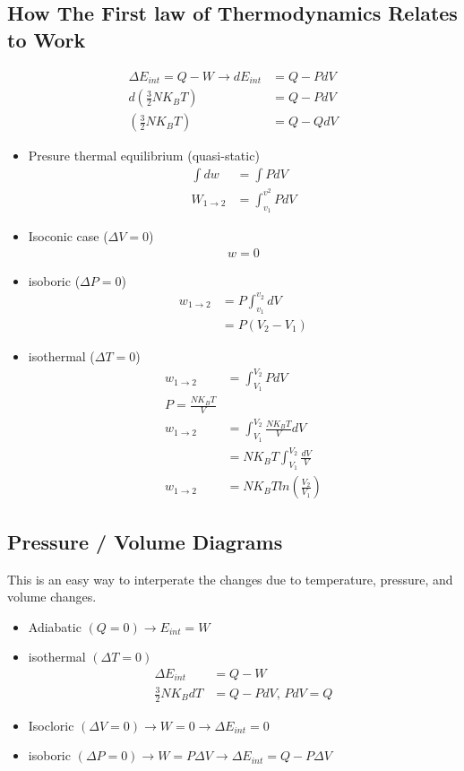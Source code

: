 	\subsection{How The First law of Thermodynamics Relates to Work}
	\begin{align*}
	\Delta E_{int} = Q-W \to dE_{int} &=Q-PdV\\
	d\left(\frac{3}{2}NK_BT\right) &= Q-PdV\\
	\left(\frac{3}{2}NK_BT\right) &=Q-QdV
	\end{align*}
	\begin{itemize}
	\item Presure thermal equilibrium (quasi-static)
	\begin{align*}
		\int{dw}&=\int{PdV}\\
		W_{1\to2}&=\int_{v_1}^{v^2}{PdV}
	\end{align*}
	\item Isoconic case ($\Delta V = 0$)
	\begin{align*}
		w=0
	\end{align*}
	\item isoboric ($\Delta P=0$)
	\begin{align*}
		w_{1\to2}&=P\int_{v_1}^{v_2}{dV}\\
		&=P(V_2-V_1)
	\end{align*}
	\item isothermal ($\Delta T=0$)
	\begin{align*}
		w_{1\to2} &= \int_{V_1}^{V_2}{PdV}\\
		P=\frac{NK_BT}{V}\\
		w_{1\to2} &=\int_{V_1}^{V_2}{\frac{NK_BT}{V}dV}\\
		&=NK_BT\int_{V_1}^{V_2}\frac{dV}{V}\\
		w_{1\to2} &= NK_BTln \left( \frac{V_2}{V_1} \right)
	\end{align*}
	\end{itemize}
	\subsection{Pressure / Volume Diagrams}
	This is an easy way to interperate the changes due to temperature, pressure, and volume changes.
	\begin{itemize}
	\item Adiabatic $(Q=0)\to E_{int}=W$
	\item isothermal $(\Delta T = 0)$
	\begin{align*}
		\Delta E_{int} &= Q-W\\
		\frac{3}{2}NK_BdT&=Q-PdV \text{, } PdV=Q
	\end{align*}
	\item Isocloric $(\Delta V = 0) \to W=0 \to \Delta E_{int}=0$
	\item isoboric $(\Delta P = 0) \to W=P\Delta V \to \Delta E_{int}=Q-P\Delta V$
	\end{itemize}

